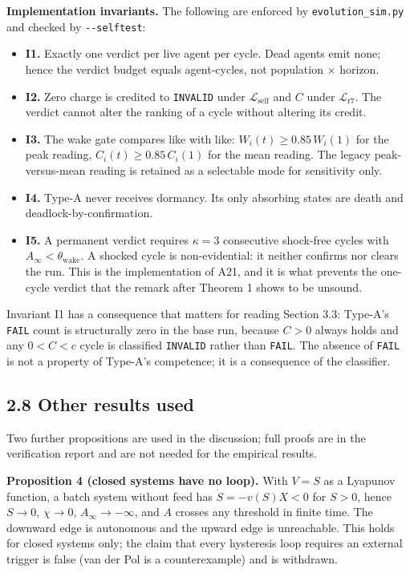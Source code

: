\documentclass[11pt,a4paper]{article}
\providecommand{\tightlist}{\setlength{\itemsep}{0pt}\setlength{\parskip}{0pt}}
\newcounter{none}
\begin{document}
\textbf{Implementation invariants.} The following are enforced by
\texttt{evolution\_sim.py} and checked by \texttt{-\/-selftest}:

\begin{itemize}
\tightlist
\item
  \textbf{I1.} Exactly one verdict per live agent per cycle. Dead agents emit none;
  hence the verdict budget equals agent-cycles, not population \(\times\) horizon.
\item
  \textbf{I2.} Zero charge is credited to \texttt{INVALID} under \(\mathcal{L}_{\mathrm{self}}\)
  and \(C\) under \(\mathcal{L}_{\mathrm{r7}}\). The verdict cannot alter the ranking
  of a cycle without altering its credit.
\item
  \textbf{I3.} The wake gate compares like with like: \(W_i(t)\ge0.85\,W_i(1)\) for the
  peak reading, \(C_i(t)\ge0.85\,C_i(1)\) for the mean reading. The legacy
  peak-versus-mean reading is retained as a selectable mode for sensitivity only.
\item
  \textbf{I4.} Type-A never receives dormancy. Its only absorbing states are death and
  deadlock-by-confirmation.
\item
  \textbf{I5.} A permanent verdict requires \(\kappa=3\) consecutive shock-free cycles
  with \(A_\infty<\theta_{\mathrm{wake}}\). A shocked cycle is non-evidential: it
  neither confirms nor clears the run. This is the implementation of A21, and it
  is what prevents the one-cycle verdict that the remark after Theorem 1 shows to
  be unsound.
\end{itemize}

Invariant I1 has a consequence that matters for reading Section 3.3: Type-A's
\texttt{FAIL} count is structurally zero in the base run, because \(C>0\) always holds and
any \(0<C<c\) cycle is classified \texttt{INVALID} rather than \texttt{FAIL}. The absence of
\texttt{FAIL} is not a property of Type-A's competence; it is a consequence of the
classifier.

\subsection{2.8 Other results used}\label{other-results-used}

Two further propositions are used in the discussion; full proofs are in the
verification report and are not needed for the empirical results.

\textbf{Proposition 4 (closed systems have no loop).} With \(V=S\) as a Lyapunov
function, a batch system without feed has \(\dot S=-v(S)X<0\) for \(S>0\), hence
\(S\to0\), \(\chi\to0\), \(A_\infty\to-\infty\), and \(A\) crosses any threshold in
finite time. The downward edge is autonomous and the upward edge is unreachable.
This holds for closed systems only; the claim that every hysteresis loop requires
an external trigger is false (van der Pol \cite{vanderpol1926} is a counterexample)
and is withdrawn.
\end{document}
